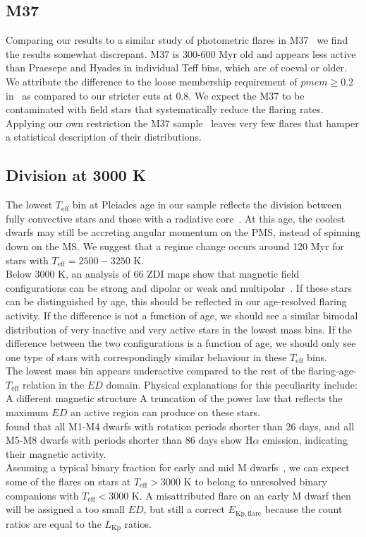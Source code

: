 \documentclass{aa}
\begin{document}
 \subsection{M37}
Comparing our results to a similar study of photometric flares in M37~\citep{chang_photometric_2015} we find the results somewhat discrepant. M37 is 300-600 Myr old and appears less active than Praesepe and Hyades in individual Teff bins, which are of coeval or older. We attribute the difference to the loose membership requirement of $pmem \geq 0.2$ in~\cite{chang_photometric_2015} as compared to our stricter cuts at 0.8. We expect the M37 to be contaminated with field stars that systematically reduce the flaring rates. Applying our own restriction the M37 sample~\citep{chang_photometric_2015_data} leaves very few flares that hamper a statistical description of their distributions.
\subsection{Division at 3000 K}
The lowest $T_\mathrm{eff}$ bin at Pleiades age in our sample reflects the division between fully convective stars and those with a radiative core~\citep{reid_new_2005}. At this age, the coolest dwarfs may still be accreting angular momentum on the PMS, instead of spinning down on the MS. We suggest that a regime change occurs around 120 Myr for stars with $T_\mathrm{eff}=2500-3250$ K.
\\
Below 3000 K, an analysis of 66 ZDI maps show that magnetic field configurations can be strong and dipolar or weak and multipolar~\citep{morin_m4magneticfields_2008, see_zdispindown_2017}. If these stars can be distinguished by age, this should be reflected in our age-resolved flaring activity. If the difference is not a function of age, we should see a similar bimodal distribution of very inactive and very active stars in the lowest mass bins. If the difference between the two configurations is a function of age, we should only see one type of stars with correspondingly similar behaviour in these $T_\mathrm{eff}$ bins.
\\
The lowest mass bin appears underactive compared to the rest of the flaring-age-$T_\mathrm{eff}$ relation in the $ED$ domain. Physical explanations for this peculiarity include:
A different magnetic structure
A truncation of the power law that reflects the maximum $ED$ an active region can produce on these stars.
\\
\citet{west_magneticrotationage_2015} found that all M1-M4 dwarfs with rotation periods shorter than 26 days, and all M5-M8 dwarfs with periods shorter than 86 days show H$\alpha$ emission, indicating their magnetic activity.
\\
Assuming a typical binary fraction for early and mid M dwarfs~\citep{fischer_multiplicity_1992}, we can expect some of the flares on stars at $T_\mathrm{eff}>3000$ K to belong to unresolved binary companions with $T_\mathrm{eff}<3000$ K. A misattributed flare on an early M dwarf then will be assigned a too small $ED$, but still a correct $E_\mathrm{Kp, flare}$ because the count ratios are equal to the $L_\mathrm{Kp}$ ratios.
\end{document}
